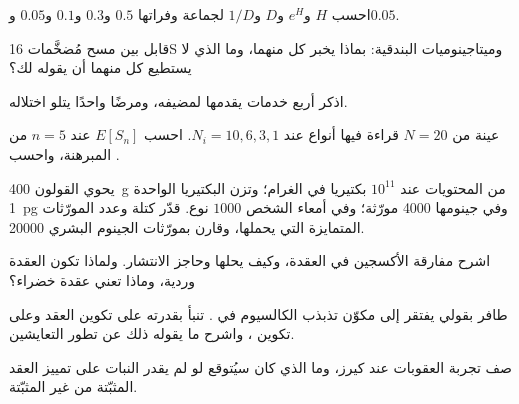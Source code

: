 \begin{exercise}[$\star$]\label{exo:b3:microbiomes:2}
احسب $H$ و$e^{H}$ و$D$ و$1/D$ لجماعة وفراتها
$0.5$ و$0.3$ و$0.1$ و$0.05$ و$0.05$.
\end{exercise}

\begin{exercise}[$\star$]\label{exo:b3:microbiomes:3}
قابل بين مسح مُضخَّمات 16S وميتاجينوميات البندقية: بماذا
يخبر كل منهما، وما الذي لا يستطيع كل منهما أن يقوله لك؟
\end{exercise}

\begin{exercise}[$\star$]\label{exo:b3:microbiomes:4}
اذكر أربع خدمات يقدمها  لمضيفه، ومرضًا
واحدًا يتلو اختلاله.
\end{exercise}

\begin{exercise}[$\star\star$]\label{exo:b3:microbiomes:5}
عينة من $N = 20$ قراءة فيها أنواع عند $N_{i} = 10, 6, 3, 1$.
احسب $E[S_{n}]$ عند $n = 5$ من المبرهنة، واحسب .
\end{exercise}

\begin{exercise}[$\star\star$]\label{exo:b3:microbiomes:6}
يحوي القولون \qty{400}{g} من المحتويات عند $10^{11}$ بكتيريا
في الغرام؛ وتزن البكتيريا الواحدة \qty{1}{pg} وفي جينومها
\num{4000} مورّثة؛ وفي أمعاء الشخص $1000$ نوع. قدّر كتلة
 وعدد المورّثات المتمايزة التي يحملها، وقارن
بمورّثات الجينوم البشري \num{20000}.
\end{exercise}

\begin{exercise}[$\star\star$]\label{exo:b3:microbiomes:7}
اشرح مفارقة الأكسجين في العقدة، وكيف يحلها 
وحاجز الانتشار. ولماذا تكون العقدة وردية، وماذا تعني عقدة
خضراء؟
\end{exercise}

\begin{exercise}[$\star\star$]\label{exo:b3:microbiomes:8}
طافر بقولي يفتقر إلى مكوّن تذبذب الكالسيوم في . تنبأ بقدرته على تكوين العقد وعلى تكوين ،
واشرح ما يقوله ذلك عن تطور التعايشين.
\end{exercise}

\begin{exercise}[$\star\star$]\label{exo:b3:microbiomes:9}
صف تجربة العقوبات عند كيرز، وما الذي كان سيُتوقع لو لم
يقدر النبات على تمييز العقد المثبّتة من غير المثبّتة.
\end{exercise}

